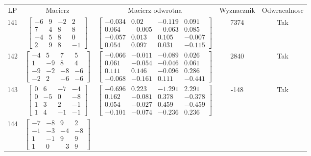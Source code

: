 \documentclass[a4paper,12pt]{article}
\begin{document}
\bgroup {} \vspace{0.2in} \begin{tabular}{c c c c c}
LP & Macierz & Macierz odwrotna & Wyznacznik & Odwracalnosc\\
141
&
$\begin{bmatrix} -6 & 9 & -2 & 2 \\ 7 & 4 & 8 & 8 \\ -4 & 5 & 8 & 0 \\ 2 & 9 & 8 & -1 \end{bmatrix}$
&
$\begin{bmatrix} -0.034 & 0.02 & -0.119 & 0.091 \\ 0.064 & -0.005 & -0.063 & 0.085 \\ -0.057 & 0.013 & 0.105 & -0.007 \\ 0.054 & 0.097 & 0.031 & -0.115 \end{bmatrix}$
&
7374
&
Tak
\\
142
&
$\begin{bmatrix} -4 & 5 & 7 & 5 \\ 1 & -9 & 8 & 4 \\ -9 & -2 & -8 & -6 \\ -2 & 2 & -6 & -6 \end{bmatrix}$
&
$\begin{bmatrix} -0.066 & -0.011 & -0.089 & 0.026 \\ 0.061 & -0.054 & -0.046 & 0.061 \\ 0.111 & 0.146 & -0.096 & 0.286 \\ -0.068 & -0.161 & 0.111 & -0.441 \end{bmatrix}$
&
2840
&
Tak
\\
143
&
$\begin{bmatrix} 0 & 6 & -7 & -4 \\ 0 & -5 & 0 & -8 \\ 1 & 3 & 2 & -1 \\ 1 & 4 & -1 & -1 \end{bmatrix}$
&
$\begin{bmatrix} -0.696 & 0.223 & -1.291 & 2.291 \\ 0.162 & -0.081 & 0.378 & -0.378 \\ 0.054 & -0.027 & 0.459 & -0.459 \\ -0.101 & -0.074 & -0.236 & 0.236 \end{bmatrix}$
&
-148
&
Tak
\\
144
&
$\begin{bmatrix} -7 & -8 & 9 & 2 \\ -1 & -3 & -4 & -8 \\ 1 & -1 & 9 & 9 \\ 1 & 0 & -3 & 9 \end{bmatrix}$

\end{tabular}
\end{document}
